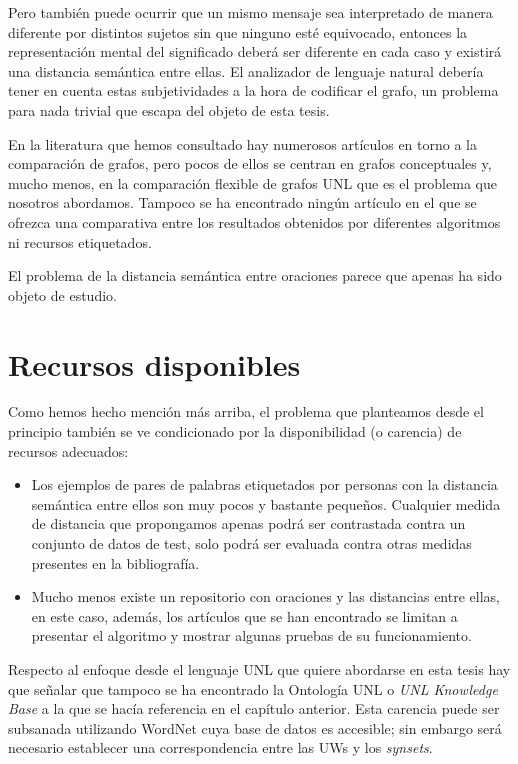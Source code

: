\documentclass[a4paper,12pt,spanish]{book}
\begin{document}
Pero también puede ocurrir que un mismo mensaje sea interpretado de manera diferente por
distintos sujetos sin que ninguno esté equivocado, entonces la representación mental del
significado deberá ser diferente en cada caso y existirá una distancia semántica entre
ellas. El analizador de lenguaje natural debería tener en cuenta estas subjetividades a
la hora de codificar el grafo, un problema para nada trivial que escapa del objeto de esta
tesis.

En la literatura que hemos consultado hay numerosos artículos en torno a la comparación
de grafos, pero pocos de ellos se centran en grafos conceptuales y, mucho menos, en la
comparación flexible de grafos UNL que es el problema que nosotros abordamos. Tampoco
se ha encontrado ningún artículo en el que se ofrezca una comparativa entre los resultados
obtenidos por diferentes algoritmos ni recursos etiquetados.

El problema de la distancia semántica entre oraciones parece que apenas ha sido
objeto de estudio.


\section{Recursos disponibles}
\label{2.problem/index:recursos-disponibles}
Como hemos hecho mención más arriba, el problema que planteamos desde el principio
también se ve condicionado por la disponibilidad (o carencia) de recursos adecuados:
\begin{itemize}
\item {} 
Los ejemplos de pares de palabras etiquetados por personas con la distancia
semántica entre ellos son muy pocos y bastante pequeños. Cualquier medida de
distancia que propongamos apenas podrá ser contrastada contra un conjunto de
datos de test, solo podrá ser evaluada contra otras medidas presentes en la
bibliografía.

\item {} 
Mucho menos existe un repositorio con oraciones y las distancias entre ellas, en
este caso, además, los artículos que se han encontrado se limitan a presentar el
algoritmo y mostrar algunas pruebas de su funcionamiento.

\end{itemize}

Respecto al enfoque desde el lenguaje UNL que quiere abordarse en esta tesis hay que
señalar que tampoco se ha encontrado la Ontología UNL o \emph{UNL Knowledge Base} a la que
se hacía referencia en el capítulo anterior. Esta carencia puede ser subsanada
utilizando WordNet cuya base de datos es accesible; sin embargo será necesario establecer
una correspondencia entre las UWs y los \emph{synsets}.
\end{document}
